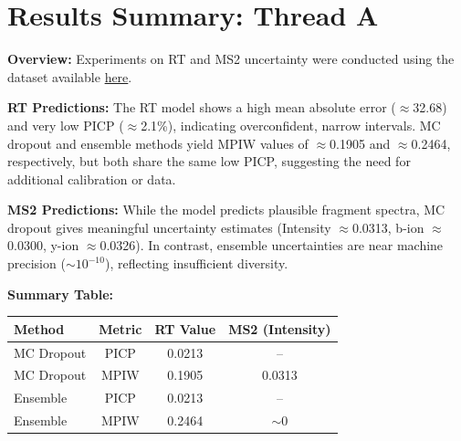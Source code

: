 \documentclass[10pt]{article}
\begin{document}
\section*{Results Summary: Thread A}

\noindent\textbf{Overview:}  
Experiments on RT and MS2 uncertainty were conducted using the dataset available \href{https://www.ebi.ac.uk/pride/archive/projects/PXD004732}{here}.

\medskip
\noindent\textbf{RT Predictions:}  
The RT model shows a high mean absolute error ($\approx$32.68) and very low PICP ($\approx$2.1\%), indicating overconfident, narrow intervals. MC dropout and ensemble methods yield MPIW values of $\approx$0.1905 and $\approx$0.2464, respectively, but both share the same low PICP, suggesting the need for additional calibration or data.

\medskip
\noindent\textbf{MS2 Predictions:}  
While the model predicts plausible fragment spectra, MC dropout gives meaningful uncertainty estimates (Intensity $\approx$0.0313, b-ion $\approx$0.0300, y-ion $\approx$0.0326). In contrast, ensemble uncertainties are near machine precision ($\sim10^{-10}$), reflecting insufficient diversity.

\medskip
\noindent\textbf{Summary Table:}
\begin{center}
\begin{tabular}{lccc}
\toprule
\textbf{Method} & \textbf{Metric} & \textbf{RT Value} & \textbf{MS2 (Intensity)} \\
\midrule
MC Dropout & PICP   & 0.0213 & -- \\
MC Dropout & MPIW   & 0.1905 & 0.0313 \\
Ensemble   & PICP   & 0.0213 & -- \\
Ensemble   & MPIW   & 0.2464 & $\sim 0$ \\
\bottomrule
\end{tabular}
\end{center}
\end{document}
